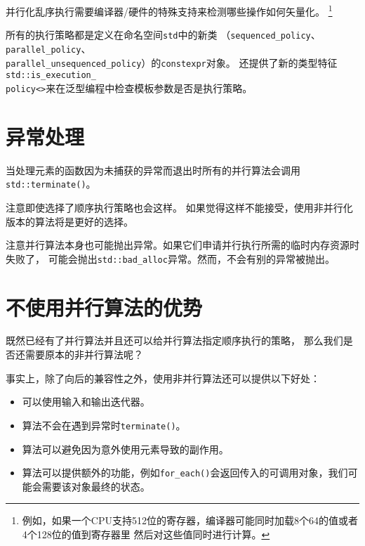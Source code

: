 并行化乱序执行需要编译器/硬件的特殊支持来检测哪些操作如何矢量化。
\footnote{例如，如果一个CPU支持512位的寄存器，编译器可能同时加载8个64的值或者4个128位的值到寄存器里
然后对这些值同时进行计算。}

所有的执行策略都是定义在命名空间\texttt{std}中的新类
（\texttt{sequenced\_policy}、\texttt{parallel\_policy}、\\
\texttt{parallel\_unsequenced\_policy}）的\texttt{constexpr}对象。
还提供了新的类型特征\texttt{std::is\_execution\_\\
policy<>}来在泛型编程中检查模板参数是否是执行策略。


\section{异常处理}
当处理元素的函数因为未捕获的异常而退出时所有的并行算法会调用\texttt{std::terminate()}。

注意即使选择了顺序执行策略也会这样。
如果觉得这样不能接受，使用非并行化版本的算法将是更好的选择。

注意并行算法本身也可能抛出异常。如果它们申请并行执行所需的临时内存资源时失败了，
可能会抛出\texttt{std::bad\_alloc}异常。然而，不会有别的异常被抛出。


\section{不使用并行算法的优势}\label{ch22.4}
既然已经有了并行算法并且还可以给并行算法指定顺序执行的策略，
那么我们是否还需要原本的非并行算法呢？

事实上，除了向后的兼容性之外，使用非并行算法还可以提供以下好处：
\begin{itemize}
    \item 可以使用输入和输出迭代器。
    \item 算法不会在遇到异常时\texttt{terminate()}。
    \item 算法可以避免因为意外使用元素导致的副作用。
    \item 算法可以提供额外的功能，例如\texttt{for\_each()}会返回传入的可调用对象，我们可能会需要该对象最终的状态。
\end{itemize}


